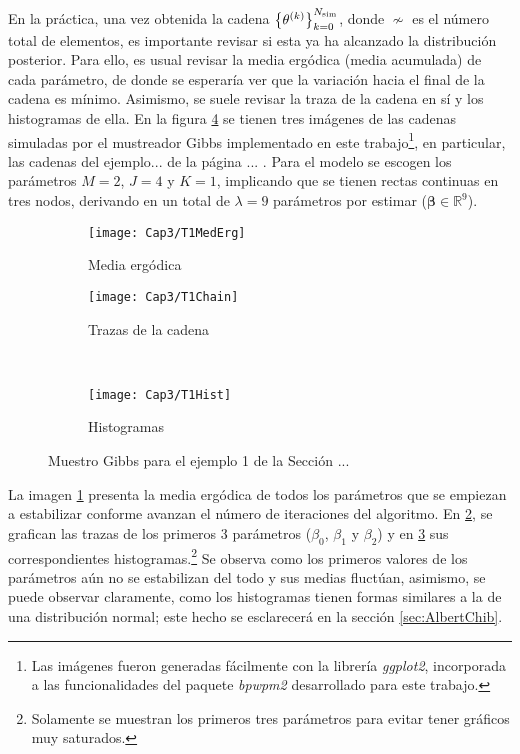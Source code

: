 \documentclass[../Main/Main.tex]{subfiles}
\begin{document}
En la práctica, una vez obtenida la cadena $\left\{\theta^{(k)}\right\}_{k=0}^{N_{\text{sim}}}$, donde $\nsim$ es el número total de elementos, es importante revisar si esta ya ha alcanzado la distribución posterior. Para ello, es usual revisar la media ergódica (media acumulada) de cada parámetro, de donde se esperaría ver que la variación hacia el final de la cadena es mínimo. Asimismo, se suele revisar la traza de la cadena en sí y los histogramas de ella. En la figura \ref{fig:GibbsSamplerSimulado} se tienen tres imágenes de las cadenas simuladas por el mustreador Gibbs implementado en este trabajo\footnote{Las imágenes fueron generadas fácilmente con la librería \textit{ggplot2}, incorporada a las funcionalidades del paquete \textit{bpwpm2} desarrollado para este trabajo.}, en particular, las cadenas del ejemplo... de la página ... . Para el modelo se escogen los parámetros $M = 2$, $J = 4$ y $K = 1$, implicando que se tienen rectas continuas en tres nodos, derivando en un total de $\lambda = 9$ parámetros por estimar ($\bm{\beta}\in\mathbb{R}^9$). 
\begin{figure}[h]
    \centering
    \begin{subfigure}[b]{0.45\textwidth}
        \texttt{[image: Cap3/T1MedErg]}
        \caption{Media ergódica}
        \label{img:MedErg}
    \end{subfigure}
	\quad
    \begin{subfigure}[b]{0.45\textwidth}
        \texttt{[image: Cap3/T1Chain]}
        \caption{Trazas de la cadena}
        \label{img:GibbsChain}
    \end{subfigure}
	\\
    \centering
    \begin{subfigure}[b]{0.45\textwidth}
        \texttt{[image: Cap3/T1Hist]}
        \caption{Histogramas}
        \label{img:GibbsHist}
    \end{subfigure}
    \caption{Muestro Gibbs para el ejemplo 1 de la Sección ...}\label{fig:GibbsSamplerSimulado}
\end{figure}
La imagen \ref{img:MedErg} presenta la media ergódica de todos los parámetros que se empiezan a estabilizar conforme avanzan el número de iteraciones del algoritmo. En \ref{img:GibbsChain}, se grafican las trazas de los primeros 3 parámetros ($\beta_0$, $\beta_1$ y $\beta_2$) y en \ref{img:GibbsHist} sus correspondientes histogramas.\footnote{Solamente se muestran los primeros tres parámetros para evitar tener gráficos muy saturados.} Se observa como los primeros valores de los parámetros aún no se estabilizan del todo y sus medias fluctúan, asimismo, se puede observar claramente, como los histogramas tienen formas similares a la de una distribución normal; este hecho se esclarecerá en la sección \ref{sec:AlbertChib}. 
\end{document}

